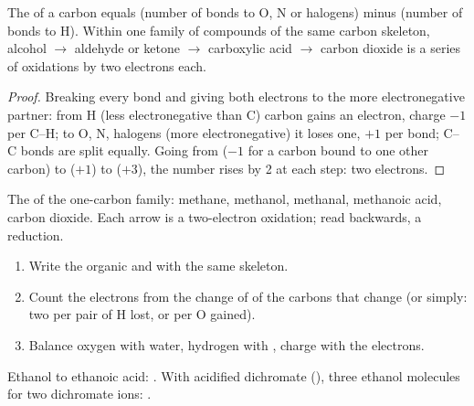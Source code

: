 \begin{proposition}\label{prop:b1:organic-redox:on-of-carbon}
The  of a carbon equals (number of bonds to O, N or
halogens) minus (number of bonds to H). Within one family of compounds
of the same carbon skeleton, alcohol $\to$ aldehyde or ketone $\to$
carboxylic acid $\to$ carbon dioxide is a series of oxidations by two
electrons each.
\end{proposition}

\begin{proof}
Breaking every bond and giving both electrons to the more electronegative
partner: from H (less electronegative than C) carbon gains an electron,
charge $-1$ per C--H; to O, N, halogens (more electronegative) it loses
one, $+1$ per bond; C--C bonds are split equally. Going from 
($-1$ for a carbon bound to one other carbon) to  ($+1$) to
 ($+3$), the number rises by 2 at each step: two electrons.
\end{proof}

\begin{omfigure}

{\small The  of the one-carbon family: methane, methanol,
methanal, methanoic acid, carbon dioxide. Each arrow is a two-electron
oxidation; read backwards, a reduction.}
\end{omfigure}

\begin{method}\label{met:b1:organic-redox:balance-organic-redox}
\begin{enumerate}
  \item Write the organic  and  with the same skeleton.
  \item Count the electrons from the change of  of the
        carbons that change (or simply: two per pair of H lost, or per O
        gained).
  \item Balance oxygen with water, hydrogen with , charge with the
        electrons.
\end{enumerate}
Ethanol to ethanoic acid: .
With acidified dichromate (),
three ethanol molecules for two dichromate ions:
.
\end{method}

